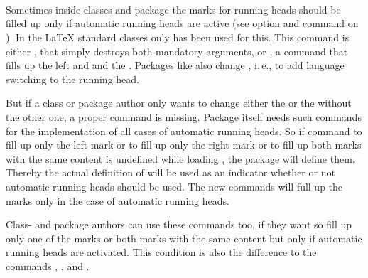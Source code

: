 %
%

\begin{Declaration}
  \\
  \\
  \\
\end{Declaration}
%
%
%
%
Sometimes inside classes and package the marks for running heads should be
filled up only if automatic running heads are active (see option
 and command  on
). In the \LaTeX{} standard
classes only  has been used for this. This command is either
, that simply destroys both mandatory arguments, or
, a command that fills up the left and  and
the . Packages like  also change
\Macro{\@mkboth}, i.\,e., to add language switching to the running head.

But if a class or package author only wants to change either the  or the  without the other one, a proper command is
missing. Package  itself needs such commands for the
implementation of all cases of automatic running heads. So if command
 to fill up only the left mark or  to fill up
only the right mark or  to fill up both marks with the same
content is undefined while loading , the package will define
them. Thereby the actual definition of  will be used as an
indicator whether or not automatic running heads should be used. The new
commands will full up the marks only in the case of automatic running heads.

Class- and package authors can use these commands too, if they want so fill up
only one of the marks or both marks with the same content but only if
automatic running heads are activated. This condition is also the difference
to the commands , , and .%
%
%
%
%


\fi %


\ifshortversion%
%
\fi


